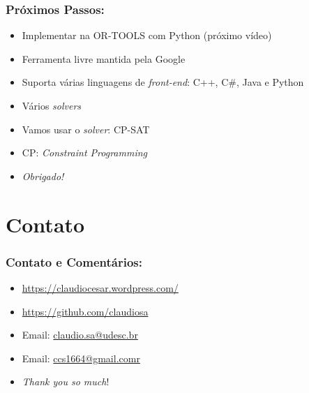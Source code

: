 \documentclass{beamer}
\begin{document}
\begin{frame} 
	\frametitle{Próximos Passos:}
	
\begin{block}{}
	
	\begin{itemize}
		\item Implementar na OR-TOOLS  com Python (próximo vídeo)
		\item Ferramenta livre mantida pela Google
		\item Suporta várias linguagens de \textit{front-end}: C++, C\#, Java e Python
		\item Vários \textit{solvers}
		\item Vamos usar o {\em solver}: CP-SAT
		\item CP: \textit{Constraint Programming}
				
		\item \textit{Obrigado!}
		
	\end{itemize}
\end{block}
\end{frame}



\section*{Contato}

\begin{frame}
\frametitle{Contato e Comentários:}
  
\begin{block}{}
  \begin{itemize}
  \item \url{https://claudiocesar.wordpress.com/}
   \item \url{https://github.com/claudiosa}
   \item Email: \url{claudio.sa@udesc.br}
    \item Email: \url{ccs1664@gmail.comr}

  \item \textit{Thank you so much}!

  \end{itemize}
  \end{block}

\end{frame}


\end{document}
